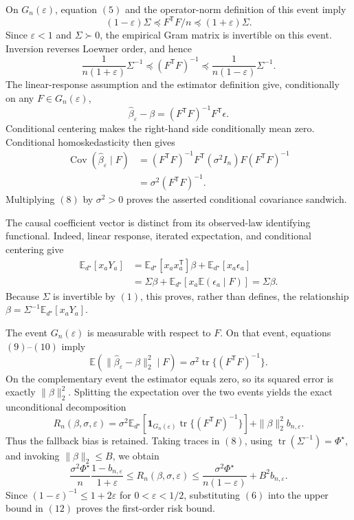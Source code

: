 On \(G_n(\varepsilon)\), equation \((5)\) and the operator-norm definition of this event imply
\[
 (1-\varepsilon)\Sigma
 \preceq F^{\mathsf T}F/n
 \preceq(1+\varepsilon)\Sigma.
 \tag{7}
\]
Since \(\varepsilon<1\) and \(\Sigma\succ0\), the empirical Gram matrix is invertible on this event.  Inversion reverses Loewner order, and hence
\[
 \frac1{n(1+\varepsilon)}\Sigma^{-1}
 \preceq(F^{\mathsf T}F)^{-1}
 \preceq\frac1{n(1-\varepsilon)}\Sigma^{-1}.
 \tag{8}
\]
The linear-response assumption and the estimator definition give, conditionally on any \(F\in G_n(\varepsilon)\),
\[
 \widehat\beta_\varepsilon-\beta
 =(F^{\mathsf T}F)^{-1}F^{\mathsf T}\epsilon.
 \tag{9}
\]
Conditional centering makes the right-hand side conditionally mean zero.  Conditional homoskedasticity then gives
\[
\begin{aligned}
 \operatorname{Cov}(\widehat\beta_\varepsilon\mid F)
 &=(F^{\mathsf T}F)^{-1}F^{\mathsf T}(\sigma^2I_n)F(F^{\mathsf T}F)^{-1}\\
 &=\sigma^2(F^{\mathsf T}F)^{-1}.
\end{aligned}
 \tag{10}
\]
Multiplying \((8)\) by \(\sigma^2>0\) proves the asserted conditional covariance sandwich.

The causal coefficient vector is distinct from its observed-law identifying functional.  Indeed, linear response, iterated expectation, and conditional centering give
\[
\begin{aligned}
 \mathbb E_{d^\star}[x_aY_a]
 &=\mathbb E_{d^\star}[x_ax_a^{\mathsf T}]\beta
   +\mathbb E_{d^\star}[x_a\epsilon_a]\\
 &=\Sigma\beta+
 \mathbb E_{d^\star}\!\left[x_a\mathbb E(\epsilon_a\mid F)\right]
 =\Sigma\beta.
\end{aligned}
\]
Because \(\Sigma\) is invertible by \((1)\), this proves, rather than defines, the relationship \(\beta=\Sigma^{-1}\mathbb E_{d^\star}[x_aY_a]\).

The event \(G_n(\varepsilon)\) is measurable with respect to \(F\).  On that event, equations \((9)\)--\((10)\) imply
\[
 \mathbb E\!\left(\|\widehat\beta_\varepsilon-\beta\|_2^2\mid F\right)
 =\sigma^2\operatorname{tr}\{(F^{\mathsf T}F)^{-1}\}.
\]
On the complementary event the estimator equals zero, so its squared error is exactly \(\|\beta\|_2^2\).  Splitting the expectation over the two events yields the exact unconditional decomposition
\[
 R_n(\beta,\sigma,\varepsilon)
 =\sigma^2\mathbb E_{d^\star}\!\left[
 \mathbf 1_{G_n(\varepsilon)}\operatorname{tr}\{(F^{\mathsf T}F)^{-1}\}\right]
 +\|\beta\|_2^2b_{n,\varepsilon}.
 \tag{11}
\]
Thus the fallback bias is retained.  Taking traces in \((8)\), using \(\operatorname{tr}(\Sigma^{-1})=\Phi^\star\), and invoking \(\|\beta\|_2\le B\), we obtain
\[
 \frac{\sigma^2\Phi^\star}{n}\frac{1-b_{n,\varepsilon}}{1+\varepsilon}
 \le R_n(\beta,\sigma,\varepsilon)
 \le\frac{\sigma^2\Phi^\star}{n(1-\varepsilon)}+B^2b_{n,\varepsilon}.
 \tag{12}
\]
Since \((1-\varepsilon)^{-1}\le1+2\varepsilon\) for \(0<\varepsilon<1/2\), substituting \((6)\) into the upper bound in \((12)\) proves the first-order risk bound.

